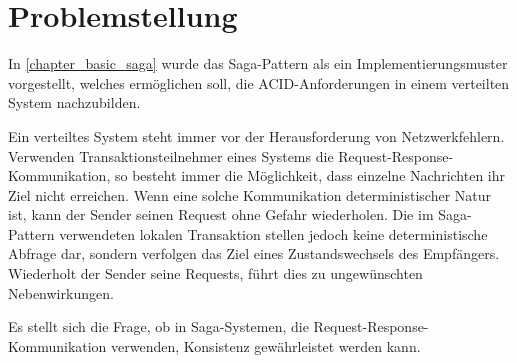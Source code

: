 \section{Problemstellung}


In \ref{chapter_basic_saga} wurde das Saga-Pattern als ein Implementierungsmuster vorgestellt, welches ermöglichen soll, die ACID-Anforderungen in einem verteilten System nachzubilden. 

Ein verteiltes System steht immer vor der Herausforderung von Netzwerkfehlern. Verwenden Transaktionsteilnehmer eines Systems die Request-Response-Kommunikation, so besteht immer die Möglichkeit, dass einzelne Nachrichten ihr Ziel nicht erreichen. Wenn eine solche Kommunikation deterministischer Natur ist, kann der Sender seinen Request ohne Gefahr wiederholen. Die im Saga-Pattern verwendeten lokalen Transaktion stellen jedoch keine deterministische Abfrage dar, sondern verfolgen das Ziel eines Zustandswechsels des Empfängers. Wiederholt der Sender seine Requests, führt dies zu ungewünschten Nebenwirkungen.

Es stellt sich die Frage, ob in Saga-Systemen, die Request-Response-Kommunikation verwenden, Konsistenz gewährleistet werden kann. 
